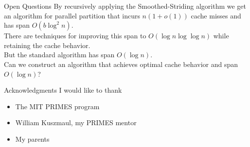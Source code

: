 \documentclass[xcolor=x11names, svgnames, rgb]{beamer}
\begin{document}


\begin{frame}[t]{Open Questions}
	By recursively applying the Smoothed-Striding algorithm we get an algorithm for
	parallel partition that incurs $n(1+o(1))$ cache misses and has span
	$O(b\log^2 n)$.\\
	\vspace{0.25cm}
	There are techniques for improving this span to $O(\log n\log\log n)$ while retaining the cache behavior.\\
	\vspace{0.25cm}
	But the standard algorithm has span $O(\log n)$.\\
	\vspace{1cm}
	Can we construct an algorithm that achieves optimal cache behavior and span $O(\log n)$?
\end{frame}

\begin{frame}[t]{Acknowledgments}
I would like to thank
\begin{itemize}
	\item {The MIT PRIMES program}
	\item {William Kuszmaul, my PRIMES mentor}
	\item {My parents}
\end{itemize}
\end{frame}
\end{document}
